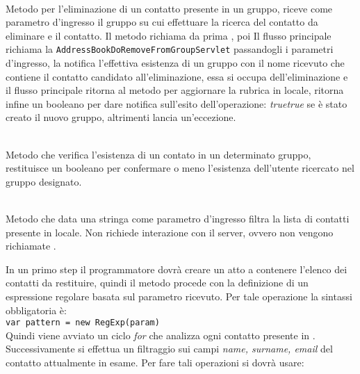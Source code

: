 \begin{description}
	\item{}\\
	Metodo per l'eliminazione di un contatto presente in un gruppo, riceve come parametro d'ingresso il gruppo su cui effettuare la ricerca del contatto da eliminare e il contatto. 
Il metodo richiama da prima , poi Il flusso principale richiama la  \texttt{AddressBookDoRemoveFromGroupServlet} passandogli i parametri d'ingresso, la  notifica l'effettiva esistenza di un gruppo con il nome ricevuto che contiene il contatto candidato all'eliminazione, essa si occupa dell'eliminazione e il flusso principale ritorna al metodo  per aggiornare la rubrica in locale, ritorna infine un  booleano per dare notifica sull'esito dell'operazione: \textit{true}\textit{true} se è stato creato il nuovo gruppo, altrimenti lancia un'eccezione.
	
	\item{}\\
Metodo che verifica l'esistenza di un contato in un determinato gruppo, restituisce un  booleano per confermare o meno l'esistenza dell'utente ricercato nel gruppo designato.

\item{}\\
Metodo che data una stringa come parametro d'ingresso filtra la lista di contatti presente in locale. Non richiede interazione con il server, ovvero non vengono richiamate .

In un primo step il programmatore dovrà creare un  atto a contenere l'elenco dei contatti da restituire, quindi il metodo procede con la definizione di un espressione regolare basata sul parametro ricevuto. Per tale operazione la sintassi obbligatoria è:\\

\verb|var pattern = new RegExp(param)|\\

Quindi viene avviato un ciclo \textit{for} che analizza ogni contatto presente in . Successivamente si effettua un filtraggio sui campi \textit{name, surname, email} del contatto attualmente in esame. Per fare tali operazioni si dovrà usare:\\


\end{description}
